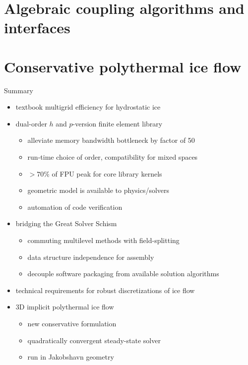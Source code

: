 \documentclass{beamer}
\begin{document}
\section{Algebraic coupling algorithms and interfaces}





\section{Conservative polythermal ice flow}



%


\begin{frame}{Summary}
  \begin{itemize}
  \item textbook multigrid efficiency for hydrostatic ice
  \item dual-order $h$ and $p$-version finite element library
    \begin{itemize}
    \item alleviate memory bandwidth bottleneck by factor of 50
    \item run-time choice of order, compatibility for mixed spaces
    \item $>70\%$ of FPU peak for core library kernels
    \item geometric model is available to physics/solvers
    \item automation of code verification
    \end{itemize}
  \item bridging the Great Solver Schism
    \begin{itemize}
    \item commuting multilevel methods with field-splitting
    \item data structure independence for assembly
    \item decouple software packaging from available solution algorithms
    \end{itemize}
  \item technical requirements for robust discretizations of ice flow
  \item 3D implicit polythermal ice flow
    \begin{itemize}
    \item new conservative formulation
    \item quadratically convergent steady-state solver
    \item run in Jakobshavn geometry
    \end{itemize}
  \end{itemize}
\end{frame}
\end{document}
